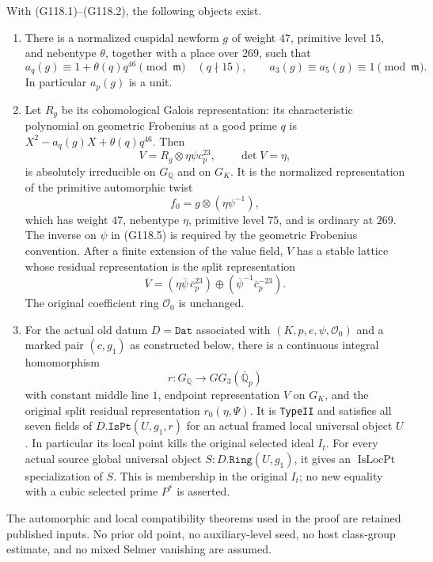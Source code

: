 \begin{theorem}
\label{AC-G118-quartic-seed}
With (G118.1)--(G118.2), the following objects exist.

\begin{enumerate}
\item There is a normalized cuspidal newform $g$ of weight $47$, primitive
level $15$, and nebentype $\theta$, together with a place over $269$, such that
\[
 a_q(g)\equiv1+\theta(q)q^{46}\pmod{\mathfrak m}
       \quad(q\nmid15),\qquad a_3(g)\equiv a_5(g)\equiv1\pmod{\mathfrak m}.
                                                        \tag{G118.3}
\]
In particular $a_p(g)$ is a unit.

\item Let $R_g$ be its cohomological Galois representation: its
characteristic polynomial on geometric Frobenius at a good prime $q$ is
$X^2-a_q(g)X+\theta(q)q^{46}$.  Then
\[
       V=R_g\otimes\eta\psi c_p^{23},\qquad \det V=\eta,
                                                        \tag{G118.4}
\]
is absolutely irreducible on $G_{\mathbb Q}$ and on $G_K$.
It is the normalized representation of the primitive automorphic twist
\[
                    f_0=g\otimes(\eta\psi^{-1}),
                                                        \tag{G118.5}
\]
which has weight $47$, nebentype $\eta$, primitive level $75$, and is ordinary
at $269$.  The inverse on $\psi$ in (G118.5) is required by the geometric
Frobenius convention.  After a finite extension of the value field, $V$ has
a stable lattice whose residual representation is the split representation
\[
             \overline V=
             (\eta\overline\psi\,\overline c_p^{23})
                \oplus(\overline\psi^{-1}\overline c_p^{-23}).
                                                        \tag{G118.6}
\]
The original coefficient ring $\mathcal O_0$ is unchanged.

\item For the actual old datum $D=\texttt{Dat}$ associated with
$(K,p,e,\psi,\mathcal O_0)$ and a marked pair $(c,g_1)$ as constructed below,
there is a continuous integral homomorphism
\[
                       r:G_{\mathbb Q}\longrightarrow GG_3(\overline{\mathbb Q}_p)
                                                        \tag{G118.7}
\]
with constant middle line $1$, endpoint representation $V$ on $G_K$, and
the original split residual representation $r_0(\eta,\Psi)$.
It is \texttt{TypeII} and satisfies all seven fields of
$D.\texttt{IsPt}(U,g_1,r)$ for an actual framed local universal object $U$.
In particular its local point kills the original selected ideal $I_t$.
For every actual source global universal object $S:D.\texttt{Ring}(U,g_1)$,
it gives an $\operatorname{IsLocPt}$ specialization of $S$.
This is membership in the original $I_t$; no new equality with a cubic
selected prime $P^*$ is asserted.
\end{enumerate}

The automorphic and local compatibility theorems used in the proof are
retained published inputs.  No prior old point, no auxiliary-level seed,
no host class-group estimate, and no mixed Selmer vanishing are assumed.
\end{theorem}

